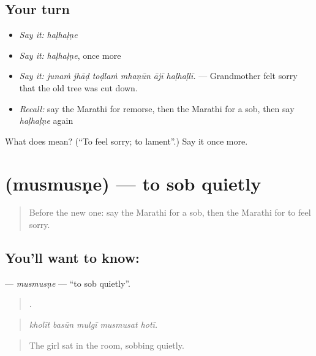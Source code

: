 \subsection*{Your turn}
\begin{itemize}
\raggedright
  \item \emph{Say it:} \emph{haḷhaḷṇe}
  \item \emph{Say it:} \emph{haḷhaḷṇe}, once more
  \item \emph{Say it:} \emph{junaṁ jhāḍ toḍlaṁ mhaṇūn ājī haḷhaḷlī.} — Grandmother felt sorry that the old tree was cut down.
  \item \emph{Recall:} say the Marathi for remorse, then the Marathi for a sob, then say \emph{haḷhaḷṇe} again
\end{itemize}

\begin{tcolorbox}[breakable,colback=teal!4,colframe=teal!35!black,title={Before you move on}]
What does  mean? (\textquotedblleft{}To feel sorry; to lament\textquotedblright{}.) Say it once more.
\end{tcolorbox}
\section[\texorpdfstring{\mr{मुसमुसणे} (musmusṇe)}{मुसमुसणे (musmusṇe)}]{ (musmusṇe) — to sob quietly}

\label{lesson:MR-C457-musmusne}



\begin{quote}
Before the new one: say the Marathi for a sob, then the Marathi for to feel sorry.
\end{quote}

\subsection*{You'll want to know: }
\textbf{} — \emph{musmusṇe} — \textquotedblleft{}to sob quietly\textquotedblright{}.

\begin{quote}
    .
\end{quote}

\begin{quote}
\emph{kholīt basūn mulgī musmusat hotī.}
\end{quote}

\begin{quote}
The girl sat in the room, sobbing quietly.
\end{quote}


